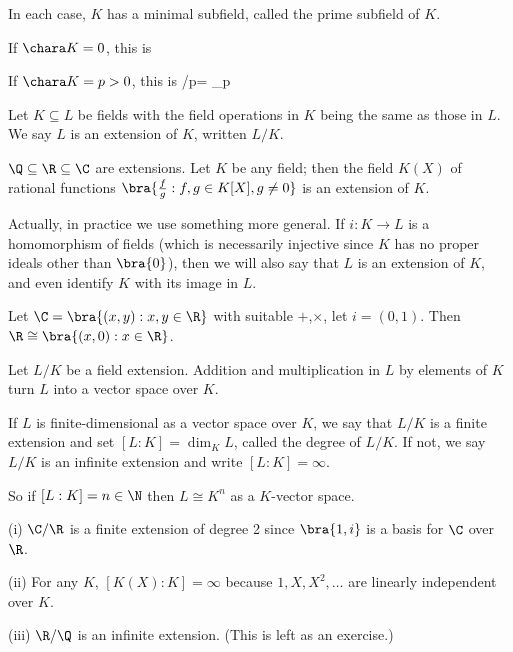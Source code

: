 In each case, $K$ has a minimal subfield, called the prime subfield of $K$.
\bit
\item If $\chara K = 0$, this is 
\be
{} \cong \Q
\ee

\item If $\chara K = p > 0$, this is
\be
{} \cong \Z/p\Z = \F_p
\ee
\eit

\begin{definition}
Let $K \subseteq L$ be fields with the field operations in $K$ being the same as those in $L$. We say $L$ is an extension of $K$, written $L/K$.
\end{definition}

\begin{example}
$\Q \subseteq \R \subseteq \C$ are extensions. Let $K$ be any field; then the field $K(X)$ of rational functions $\bra{\frac fg : f, g \in K[X], g \neq  0}$ is an extension of $K$.
\end{example}

Actually, in practice we use something more general. If $i : K \to L$ is a homomorphism of fields (which is necessarily injective since $K$ has no proper ideals other than $\bra{0}$), then we will also say that $L$ is an extension of $K$, and even identify $K$ with its image in $L$.

\begin{example}
Let $\C = \bra{(x, y) : x, y \in\R}$ with suitable $+$,$\times$, let $i = (0, 1)$. Then $\R \cong \bra{(x, 0): x \in\R}$.
\end{example}

Let $L/K$ be a field extension. Addition and multiplication in $L$ by elements of $K$ turn $L$ into a vector space over $K$.

\begin{definition}
If $L$ is finite-dimensional as a vector space over $K$, we say that $L/K$ is a finite extension and set $[L : K] = \dim_K L$, called the degree of $L/K$. If not, we say $L/K$ is an infinite extension and write $[L : K] = \infty$.
\end{definition}

So if $[L : K] = n \in \N$ then $L \cong K^n$ as a $K$-vector space.

\begin{example}
\ben
\item [(i)] $\C/\R$ is a finite extension of degree 2 since $\bra{1, i}$ is a basis for $\C$ over $\R$.
\item [(ii)] For any $K$, $[K(X) : K] = \infty$ because $1,X,X^2, \dots$ are linearly independent over $K$.
\item [(iii)] $\R/\Q$ is an infinite extension. (This is left as an exercise.)
\een
\end{example}

